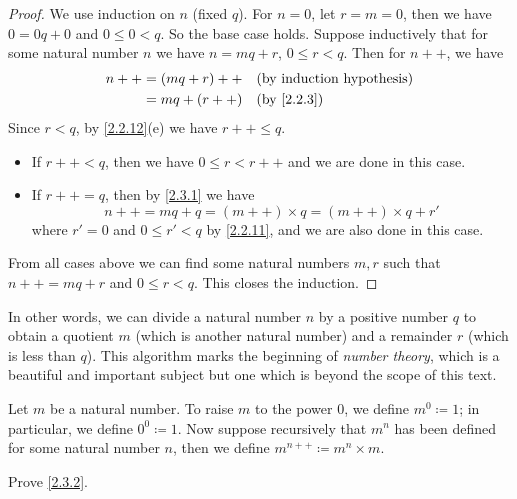 \begin{proof}
  We use induction on \(n\) (fixed \(q\)).
  For \(n = 0\), let \(r = m = 0\), then we have \(0 = 0q + 0\) and \(0 \leq 0 < q\).
  So the base case holds.
  Suppose inductively that for some natural number \(n\) we have \(n = mq + r\), \(0 \leq r < q\).
  Then for \(n++\), we have
  \begin{align*}
    n++ & = (mq + r)++ &  & \text{(by induction hypothesis)} \\
        & = mq + (r++) &  & \text{(by \cref{2.2.3})}         \\
  \end{align*}
  Since \(r < q\), by \cref{2.2.12}(e) we have \(r++ \leq q\).
  \begin{itemize}
    \item If \(r++ < q\), then we have \(0 \leq r < r++\) and we are done in this case.
    \item If \(r++ = q\), then by \cref{2.3.1} we have
          \[
            n++ = mq + q = (m++) \times q = (m++) \times q + r'
          \]
          where \(r' = 0\) and \(0 \leq r' < q\) by \cref{2.2.11}, and we are also done in this case.
  \end{itemize}
  From all cases above we can find some natural numbers \(m, r\) such that \(n++ = mq + r\) and \(0 \leq r < q\).
  This closes the induction.
\end{proof}

\begin{rmk}\label{2.3.10}
  In other words, we can divide a natural number \(n\) by a positive number \(q\) to obtain a quotient \(m\) (which is another natural number) and a remainder \(r\) (which is less than \(q\)).
  This algorithm marks the beginning of \emph{number theory}, which is a beautiful and important subject but one which is beyond the scope of this text.
\end{rmk}

\begin{defn}\label{2.3.11}
  Let \(m\) be a natural number.
  To raise \(m\) to the power \(0\), we define \(m^0 \coloneqq 1\); in particular, we define \(0^0 \coloneqq 1\).
  Now suppose recursively that \(m^n\) has been defined for some natural number \(n\), then we define \(m^{n++} \coloneqq m^n \times m\).
\end{defn}

\exercisesection

\begin{ex}\label{ex:2.3.1}
  Prove \cref{2.3.2}.
\end{ex}

